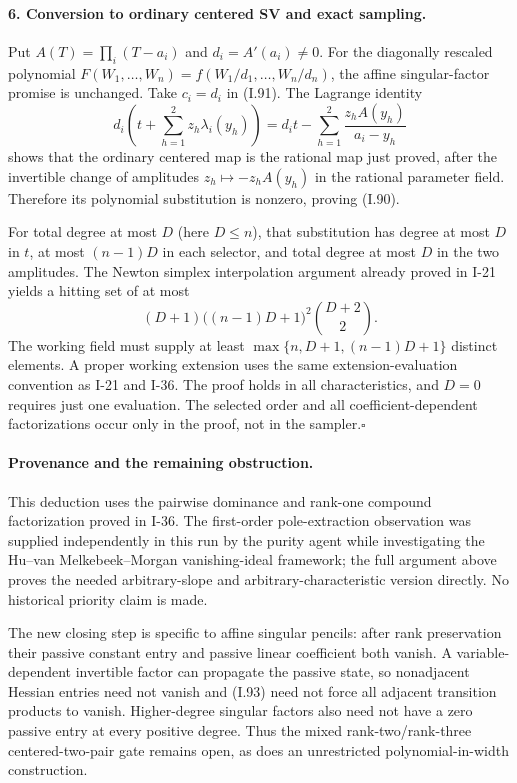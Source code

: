 \paragraph{6. Conversion to ordinary centered SV and exact sampling.}
Put $A(T)=\prod_i(T-a_i)$ and $d_i=A'(a_i)\ne0$. For the
diagonally rescaled polynomial
$F(W_1,\ldots,W_n)=f(W_1/d_1,\ldots,W_n/d_n)$, the affine
singular-factor promise is unchanged. Take $c_i=d_i$ in (I.91).
The Lagrange identity
\[
 d_i\left(t+\sum_{h=1}^{2}z_h\lambda_i(y_h)\right)
 =d_i t-\sum_{h=1}^{2}\frac{z_h A(y_h)}{a_i-y_h}
 \tag{I.99}
\]
shows that the ordinary centered map is the rational map just
proved, after the invertible change of amplitudes
$z_h\mapsto-z_hA(y_h)$ in the rational parameter field.
Therefore its polynomial substitution is nonzero, proving (I.90).

For total degree at most $D$ (here $D\le n$), that substitution
has degree at most $D$ in $t$, at most $(n-1)D$ in each selector,
and total degree at most $D$ in the two amplitudes. The Newton
simplex interpolation argument already proved in I-21 yields
a hitting set of at most
\[
 (D+1)\bigl((n-1)D+1\bigr)^2\binom{D+2}{2}.
 \tag{I.100}
\]
The working field must supply at least
$\max\{n,D+1,(n-1)D+1\}$ distinct elements. A proper working
extension uses the same extension-evaluation convention as
I-21 and I-36. The proof holds in all characteristics, and
$D=0$ requires just one evaluation. The selected order and
all coefficient-dependent factorizations occur only in the
proof, not in the sampler.\hfill$\square$

\paragraph{Provenance and the remaining obstruction.}
This deduction uses the pairwise dominance and rank-one compound
factorization proved in I-36. The first-order pole-extraction
observation was supplied independently in this run by the purity
agent while investigating the Hu--van Melkebeek--Morgan
vanishing-ideal framework; the full argument above proves the
needed arbitrary-slope and arbitrary-characteristic version
directly. No historical priority claim is made.

The new closing step is specific to affine singular pencils:
after rank preservation their passive constant entry and passive
linear coefficient both vanish. A variable-dependent invertible
factor can propagate the passive state, so nonadjacent Hessian
entries need not vanish and (I.93) need not force all adjacent
transition products to vanish. Higher-degree singular factors
also need not have a zero passive entry at every positive degree.
Thus the mixed rank-two/rank-three centered-two-pair gate remains
open, as does an unrestricted polynomial-in-width construction.
